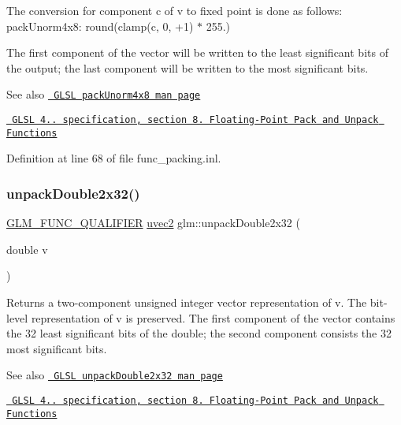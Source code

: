 The conversion for component c of v to fixed point is done as follows\+: pack\+Unorm4x8\+: round(clamp(c, 0, +1) $\ast$ 255.)

The first component of the vector will be written to the least significant bits of the output; the last component will be written to the most significant bits.

\begin{DoxySeeAlso}{See also}
\href{http://www.opengl.org/sdk/docs/manglsl/xhtml/packUnorm4x8.xml}{\texttt{ G\+L\+SL pack\+Unorm4x8 man page}} 

\href{http://www.opengl.org/registry/doc/GLSLangSpec.4.20.8.pdf}{\texttt{ G\+L\+SL 4.. specification, section 8. Floating-\/\+Point Pack and Unpack Functions}} 
\end{DoxySeeAlso}


Definition at line 68 of file func\+\_\+packing.\+inl.

\mbox{\label{group__core__func__packing_gaea67aa4d065175e7746b2a8a2d00cedb}} 
\subsubsection{\texorpdfstring{unpackDouble2x32()}{unpackDouble2x32()}}
{\footnotesize\ttfamily \mbox{\hyperlink{setup_8hpp_a33fdea6f91c5f834105f7415e2a64407}{G\+L\+M\+\_\+\+F\+U\+N\+C\+\_\+\+Q\+U\+A\+L\+I\+F\+I\+ER}} \mbox{\hyperlink{group__core__types_gafd2041b45eff671aa8899d2c2835eee9}{uvec2}} glm\+::unpack\+Double2x32 (\begin{DoxyParamCaption}\item[{double}]{v }\end{DoxyParamCaption})}

Returns a two-\/component unsigned integer vector representation of v. The bit-\/level representation of v is preserved. The first component of the vector contains the 32 least significant bits of the double; the second component consists the 32 most significant bits.

\begin{DoxySeeAlso}{See also}
\href{http://www.opengl.org/sdk/docs/manglsl/xhtml/unpackDouble2x32.xml}{\texttt{ G\+L\+SL unpack\+Double2x32 man page}} 

\href{http://www.opengl.org/registry/doc/GLSLangSpec.4.20.8.pdf}{\texttt{ G\+L\+SL 4.. specification, section 8. Floating-\/\+Point Pack and Unpack Functions}} 
\end{DoxySeeAlso}


